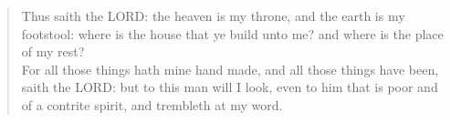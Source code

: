 \documentclass[MAIN]{subfiles}
\begin{document}
\begin{verse}
Thus saith the {\hge LORD}: the heaven is my throne, and the earth is my footstool: where is the house that ye build unto me? and where is the place of my rest?\\
For all those things hath mine hand made, and all those things have been, saith the {\hge LORD}: but to this man will I look, even to him that is poor and of a contrite spirit, and trembleth at my word.
\end{verse}
\end{document}
